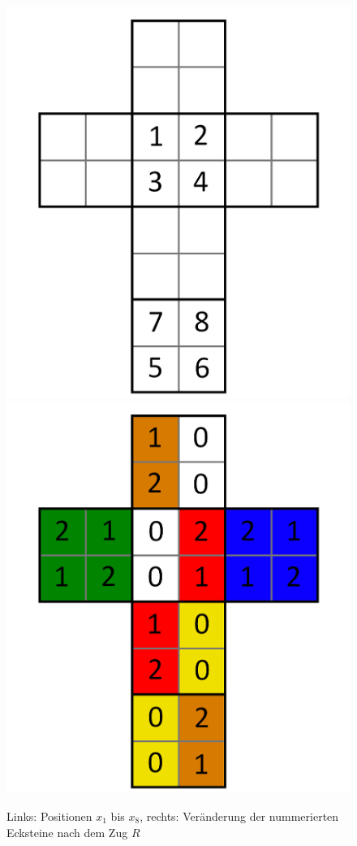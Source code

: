 \documentclass[12pt,a4paper, usenames, dvipsnames]{article}
\theoremstyle{mystyle}
\theoremstyle{definition}
\begin{document}
\begin{figure}[H]
\centering
\includegraphics[scale=0.13]{foldedout_012_white.png} \hspace*{2em}
\includegraphics[scale=0.13]{foldedout_012_spin.png}
\caption[Links: $x_1$ bis $x_8$, rechts: Veränderung nach dem Zug $R$]{Links: Positionen $x_1$ bis $x_8$, rechts: Veränderung der nummerierten Ecksteine nach dem Zug $R$}
\label{Abbildung_XnachZugR}
\end{figure}
\end{document}
